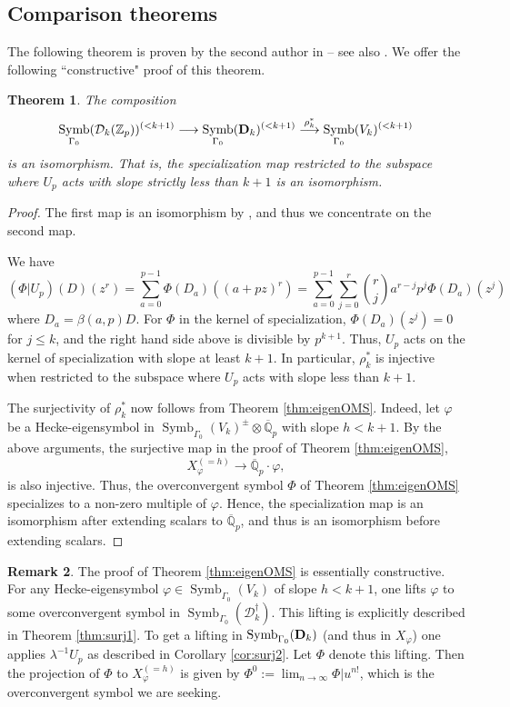 \documentclass{amsart}
\theoremstyle{plain}
\newtheorem{thm}{Theorem}[section]
\theoremstyle{definition}
\newtheorem{remark}[thm]{Remark}
\newcommand{\D}{{\mathcal D}}
\newcommand{\bD}{{\bf D}}
\newcommand{\Z}{{\mathbb Z}}
\newcommand{\Q}{{\mathbb Q}}
\newcommand{\Qpbar}{\overline{{\Q}}_p}
\newcommand{\Zp}{\Z_p}
\newcommand{\maps}{\rightarrow}
\newcommand{\lra}{\longrightarrow}
\newcommand{\bap}{\beta(a,p)}
\renewcommand{\binom}[2]{\genfrac{(}{)}{0pt}{}{#1}{#2}}
\renewcommand{\sp}{{\rho^*_k}}
\newcommand{\Dvrig}[1]{\bD_{#1}}
\newcommand{\Dkrig}{\Dvrig{k}}
\newcommand{\Dkoc}{\D_k^\dag}
\newcommand{\Dvla}[1]{\D_{#1}(\Zp)}
\newcommand{\Dkla}{\Dvla{k}}
\DeclareMathOperator{\Symb}{Symb}
\newcommand{\MSo}[1]{\Symb_{\Gamma_0}(#1)}
\begin{document}
\subsection{Comparison theorems}

The following theorem is proven by the second author in \cite{Stevens} -- see also \cite[Theorem 5.3]{PS}.  We offer the following ``constructive" proof of this theorem.


\begin{thm}
\label{thm:comparison} The composition
$$
\MSo{\Dkla}^{(<k+1)} \lra \MSo{\Dkrig}^{(<k+1)} \stackrel{\sp}{\lra} \MSo{V_k}^{(<k+1)}
$$
is an isomorphism.  That is, the specialization map restricted to
the subspace where $U_p$ acts with slope strictly less than $k+1$
is an isomorphism.
\end{thm}

\begin{proof}
The first map is an isomorphism by \cite[Lemma 5.2]{PS}, and thus we concentrate on the second map.  

We have
$$
(\Phi \big| U_p)(D)(z^r) 
= \sum_{a=0}^{p-1}  \Phi(D_a)\left((a+pz)^r \right)
= \sum_{a=0}^{p-1} \sum_{j=0}^r \binom{r}{j} a^{r-j} p^j \Phi(D_a)(z^j)
$$
where $D_a = \bap D$.  For $\Phi$ in the kernel of specialization, $\Phi(D_a)(z^j) = 0$ for $j \leq k$, and the right hand side above is divisible by $p^{k+1}$.
Thus, $U_p$ acts on the kernel of specialization with slope at least $k+1$.  In particular, $\sp$ is injective when restricted to the subspace where $U_p$ acts with slope less than $k+1$.

The surjectivity of $\sp$ now follows from Theorem \ref{thm:eigenOMS}.  Indeed, let $\varphi$ be a Hecke-eigensymbol in  $\MSo{V_k}^\pm \otimes \Qpbar$ with slope $h < k+1$.
By the above arguments, the surjective map in the proof of Theorem
\ref{thm:eigenOMS},
$$
X_\varphi^{(=h)} \maps \Qpbar \cdot \varphi,
$$
is also injective.  Thus, the overconvergent symbol $\Phi$ of
Theorem \ref{thm:eigenOMS} specializes to a non-zero
multiple of $\varphi$. Hence, the specialization map is an
isomorphism after extending scalars to $\Qpbar$, and thus is an
isomorphism before extending scalars.
\end{proof}


\begin{remark}
\label{rmk:explicit}
The proof of Theorem \ref{thm:eigenOMS} is essentially constructive.  For any Hecke-eigensymbol $\varphi \in \MSo{V_k}$ of slope $h < k+1$, one lifts $\varphi$ to some overconvergent symbol in $\MSo{\Dkoc}$.  This lifting is explicitly described in Theorem \ref{thm:surj1}.  To get a lifting in $\MSo{\Dkrig}$ (and thus in $X_\varphi$) one applies $\lambda^{-1} U_p$ as described in Corollary \ref{cor:surj2}.  Let $\Phi$ denote this lifting.  Then the projection of $\Phi$ to $X_\varphi^{(=h)}$ is given by  $\displaystyle \Phi^0 := \lim_{n \maps \infty} \Phi | u^{n!}$, which is the overconvergent symbol we are seeking.
\end{remark}
\end{document}
